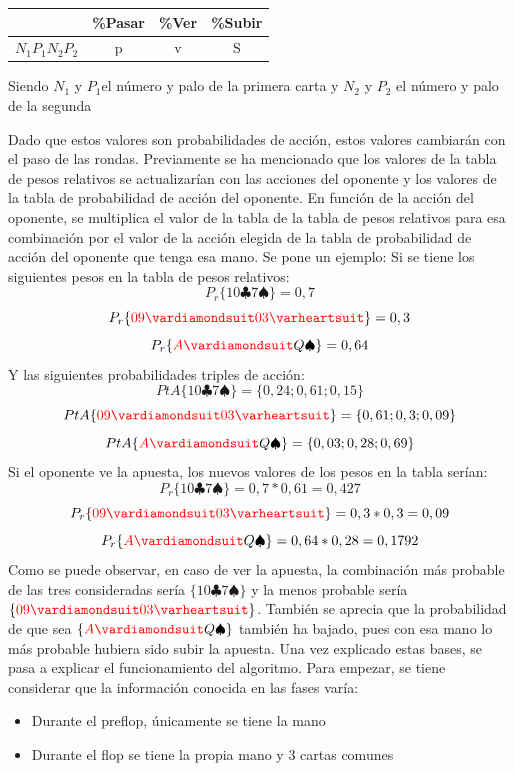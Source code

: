 \begin{itemize}
\begin{longtable}[c]{|c|c|c|c|}
\hline
 & \%Pasar & \%Ver & \%Subir \\ \hline
$N_1P_1N_2P_2$ & p & v & S \\ \hline
\end{longtable}

Siendo $ N_1$ y $P_1$el número y palo de la primera carta y $N_2$ y $P_2$ el número y palo de la segunda

Dado que estos valores son probabilidades de acción, estos valores cambiarán con el paso de las rondas.
Previamente se ha mencionado que los valores de la tabla de pesos relativos se actualizarían con las acciones del oponente y los valores de la tabla de probabilidad de acción del oponente. En función de la acción del oponente, se multiplica el valor de la tabla de la tabla de pesos relativos para esa combinación por el valor de la acción elegida de la tabla de probabilidad de acción del oponente que tenga esa mano.
Se pone un ejemplo:
Si se tiene los siguientes pesos en la tabla de pesos relativos:
\[
P_r \{10\clubsuit 7\spadesuit\} = 0,7
\]
\[
P_r\{\textcolor{red}{09\vardiamondsuit 03\varheartsuit}\} = 0,3
\]
\[
P_r \{\textcolor{red}{A\vardiamondsuit} Q\spadesuit\} = 0,64
\]
Y las siguientes probabilidades triples de acción:
\[
PtA \{10\clubsuit 7\spadesuit\} = \{0,24; 0,61; 0,15\}
\]
\[
PtA \{\textcolor{red}{09\vardiamondsuit 03\varheartsuit}\} = \{0,61; 0,3; 0,09\}
\]
\[
PtA \{\textcolor{red}{A\vardiamondsuit} Q\spadesuit\} = \{0,03; 0,28; 0,69\}
\]
Si el oponente ve la apuesta, los nuevos valores de los pesos en la tabla serían:
\[
P_r \{10\clubsuit 7\spadesuit\}  = 0,7*0,61=0,427
\]
\[
P_r\{\textcolor{red}{09\vardiamondsuit 03\varheartsuit}\} = 0,3*0,3 = 0,09
\]
\[
P_r \{\textcolor{red}{A\vardiamondsuit} Q\spadesuit\} = 0,64*0,28 = 0,1792
\]
Como se puede observar, en caso de ver la apuesta, la combinación más probable de las tres consideradas sería $\{10\clubsuit 7\spadesuit\}$ y la menos probable sería $\{\textcolor{red}{09\vardiamondsuit 03\varheartsuit}\}$. También se aprecia que la probabilidad de que sea  $\{\textcolor{red}{A\vardiamondsuit} Q\spadesuit\}$ también ha bajado, pues con esa mano lo más probable hubiera sido subir la apuesta.
Una vez explicado estas bases, se pasa a explicar el funcionamiento del algoritmo.
Para empezar, se tiene considerar que la información conocida en las fases varía:
\begin{itemize}
\item Durante el preflop, únicamente se tiene la mano 
\item Durante el flop se tiene la propia mano y 3 cartas comunes

\end{itemize}
\end{itemize}
